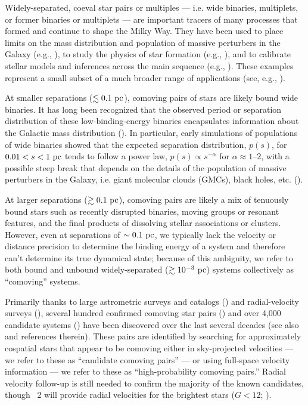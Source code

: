 \documentclass[modern, letterpaper]{aastex61}
\newcommand{\gaia}{\project{Gaia}}
\newcommand{\DR}[1]{\acronym{DR}#1}
\begin{document}
Widely-separated, coeval star pairs or multiples --- i.e. wide binaries,
multiplets, or former binaries or multiplets --- are important tracers of many
processes that formed and continue to shape the Milky Way.
They have been used to place limits on the mass distribution and population of
massive perturbers in the Galaxy (e.g.,
\citealt{Yoo:2004,Monroy-Rodriguez:2014}), to study the physics of star
formation (e.g., \citealt{Parker:2009,Reipurth:2012}), and to calibrate stellar
models and inferences across the main sequence (e.g., \citealt{Brewer:2016}).
These examples represent a small subset of a much broader range of applications
(see, e.g., \citealt{Chaname:2007}).

At smaller separations ($\lesssim 0.1~\mathrm{pc}$), comoving pairs of stars are likely
bound wide binaries.
It has long been recognized that the observed period or separation distribution
of these low-binding-energy binaries encapsulates information about the
Galactic mass distribution (\citealt{Opik:1924,Oort:1950,Bahcall:1985}).
In particular, early simulations of populations of wide binaries showed that
the expected separation distribution, $p(s)$, for $0.01 < s < 1~\mathrm{pc}$ tends to
follow a power law, $p(s) \propto s^{-\alpha}$ for $\alpha \approx 1$--$2$,
with a possible steep break that depends on the details of the population of
massive perturbers in the Galaxy, i.e. giant molecular clouds (GMCs), black
holes, etc. (\citealt{Weinberg:1987}).

At larger separations ($\gtrsim 0.1~\mathrm{pc}$), comoving pairs are likely a mix of
tenuously bound stars such as recently disrupted binaries, moving groups or resonant
features, and the final products of dissolving stellar associations or
clusters.
However, even at separations of $\sim 0.1~\mathrm{pc}$, we typically lack the velocity
or distance precision to determine the binding energy of a system and therefore
can't determine its true dynamical state; because of this ambiguity, we refer to
both bound and unbound widely-separated ($\gtrsim 10^{-3}~\mathrm{pc}$) systems
collectively as ``comoving'' systems.

Primarily thanks to large astrometric surveys and catalogs
(\citealt{ESA:1997,Lepine:2005,Gaia-Collaboration:2016}) and radial-velocity
surveys (\citealt{Steinmetz:2006}), several hundred confirmed comoving star
pairs (\citealt{Shaya:2011}) and over 4,000 candidate systems
(\citealt{Gould:2004,Lepine:2007,Tokovinin:2012,Allen:2014,Oh:2017,
Oelkers:2017, Andrews:2017}) have been discovered over the last several decades
(see also \citealt{Chaname:2007} and references therein).
These pairs are identified by searching for approximately cospatial stars that
appear to be comoving either in sky-projected velocities --- we refer to these
as ``candidate comoving pairs'' --- or using full-space velocity information ---
we refer to these as ``high-probability comoving pairs.''
Radial velocity follow-up is still needed to confirm the majority of the known
candidates, though \gaia\ \DR{2} will provide radial velocities for the
brightest stars ($G < 12$; \citealt{Gaia-Collaboration:2016}).
\end{document}
